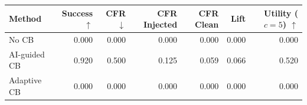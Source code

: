 \begin{tabular}{lrrrrrr}
\toprule
Method & Success $\uparrow$ & CFR $\downarrow$ & CFR Injected & CFR Clean & Lift & Utility ($c=5$) $\uparrow$ \\
\midrule
No CB & 0.000 & 0.000 & 0.000 & 0.000 & 0.000 & 0.000 \\
AI-guided CB & 0.920 & 0.500 & 0.125 & 0.059 & 0.066 & 0.520 \\
Adaptive CB & 0.000 & 0.000 & 0.000 & 0.000 & 0.000 & 0.000 \\
\bottomrule
\end{tabular}
